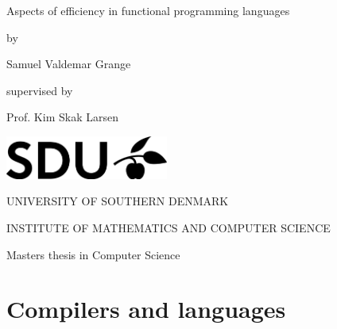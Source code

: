 \documentclass[11pt,oneside,a4paper]{report}
\begin{document}
\begin{titlepage}
    \begin{center}
        \vspace*{1cm}
        \huge{Aspects of efficiency in functional programming languages}

        \vspace*{0.5cm}
        \large{by}

        \vspace{0.5cm}
        \Large{Samuel Valdemar Grange}

        \vspace*{0.5cm}
        \normalsize{supervised by}

        \vspace{0.5cm}
        \large{Prof. Kim Skak Larsen}

        \vfill

        \vspace*{0.7cm}
        \includegraphics[width=0.4\textwidth]{sdulogo}

        \vspace*{1cm}
        \MakeUppercase{University of southern Denmark}

        \vspace*{0.3cm}
        \MakeUppercase{Institute of mathematics and computer science}

        \vspace*{0.3cm}
        \large{Masters thesis in Computer Science}
    \end{center}
    
\end{titlepage}

\tableofcontents

\part{Compilers and languages}



{}

\end{document}
